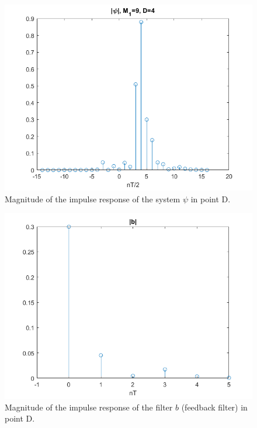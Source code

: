 \documentclass[a4paper,11.5pt]{article}
\begin{document}
\begin{figure}[H]
	\begin{center}   
		\includegraphics[width=\textwidth]{figs/D_psi.png} 
		\caption{Magnitude of the impulse response of the system $\psi$ in point D.}
		\label{fig:D_psi}
	\end{center}
\end{figure}

\begin{figure}[H]
	\begin{center}   
		\includegraphics[width=\textwidth]{figs/D_b.png} 
		\caption{Magnitude of the impulse response of the filter $b$ (feedback filter) in point D.}
		\label{fig:D_b}
	\end{center}
\end{figure}
\end{document}
